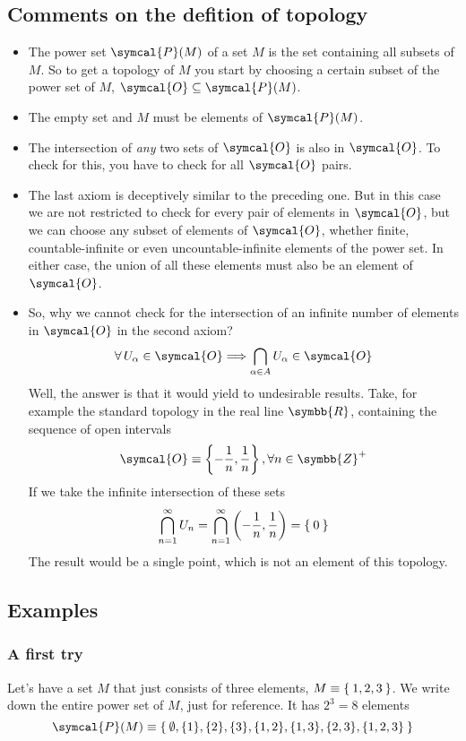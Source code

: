 \subsection{Comments on the defition of topology}
\begin{itemize}
\item The power set $\symcal{P}(M)$ of a set $M$ is the set containing all
  subsets of $M$.
  So to get a topology of $M$ you start by choosing a certain subset of the
  power set of $M$, $\symcal{O} \subseteq\symcal{P}(M)$.
\item The empty set and $M$ must be elements of $\symcal{P}(M)$.
\item The intersection of \emph{any} two sets of $\symcal{O}$ is also in
  $\symcal{O}$.
  To check for this, you have to check for all $\symcal{O}$ pairs.
\item The last axiom is deceptively similar to the preceding one. But in this
  case we are not restricted to check for every pair of elements in
  $\symcal{O}$, but we can choose any subset of elements of $\symcal{O}$,
  whether finite, countable-infinite or even uncountable-infinite elements of
  the power set. In either case, the union of all these elements must also be
  an element of $\symcal{O}$.
\item So, why we cannot check for the intersection of an infinite number of
  elements in $\symcal{O}$ in the second axiom?
  \[
    \forall\, U_\alpha \in \symcal{O}  \Longrightarrow \bigcap_{\alpha\in A}
    U_\alpha \in \symcal{O}
  \]
  Well, the answer is that it would yield to undesirable results.
  Take, for example the standard topology in the real line $\symbb{R}$,
  containing the sequence of open intervals
  \[
    \symcal{O}\equiv\left\{-\frac{1}{n}, \frac{1}{n}\right\},
    \forall n \in \symbb{Z}^{+}
  \]
  If we take the infinite intersection of these sets
  \[
    \bigcap_{n=1}^{\infty}U_n
    = \bigcap_{n=1}^{\infty} \left(-\frac{1}{n}, \frac{1}{n}\right)
    = \Set{0}
  \]
  The result would be a single point, which is not an element of this topology.
\end{itemize}

\subsection{Examples}
\subsubsection{A first try}
Let's have a set $M$ that just consists of three elements,
$M\equiv\Set{1,2,3}$.
We write down the entire power set of $M$, just for reference. It has $2^3 = 8$
elements
\[
  \symcal{P}(M)
  \equiv
  \Set{\emptyset, \{1\}, \{2\}, \{3\}, \{1,2\}, \{1,3\}, \{2,3\}, \{1,2,3\}}
\]

